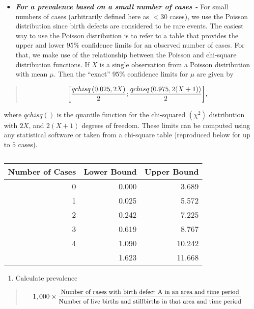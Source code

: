 \documentclass[
]{krantz}
\providecommand{\tightlist}{%
  \setlength{\itemsep}{0pt}\setlength{\parskip}{0pt}}
\begin{document}
\begin{itemize}
\tightlist
\item
  \textbf{\emph{For a prevalence based on a small number of cases -}} For small numbers of cases (arbitrarily defined here as \(< 30\) cases), we use the Poisson distribution since birth defects are considered to be rare events. The easiest way to use the Poisson distribution is to refer to a table that provides the upper and lower \(95\%\) confidence limits for an observed number of cases. For that, we make use of the relationship between the Poisson and chi-square distribution functions. If \(X\) is a single observation from a Poisson distribution with mean \(\mu\). Then the ``exact'' \(95\%\) confidence limits for \(\mu\) are given by
\end{itemize}

\begin{quote}
\[
\small{
\left[\dfrac{qchisq\left(0.025, 2X\right)}{2}; \dfrac{qchisq\left(0.975, 2(X+1)\right)}{2}\right]},
\]
\end{quote}

where \(qchisq()\) is the quantile function for the chi-squared \(\left(\chi^{2}\right)\) distribution with \(2X\), and \(2(X+1)\) degrees of freedom. These limits can be computed using any statistical software or taken from a chi-square table (reproduced below for up to \(5\) cases).

\begin{table}

\caption{\label{tab:pois1}}
\centering
\begin{tabular}[t]{rrr}
\toprule
Number of Cases & Lower Bound & Upper Bound\\
\midrule
0 & 0.000 & 3.689\\
1 & 0.025 & 5.572\\
2 & 0.242 & 7.225\\
3 & 0.619 & 8.767\\
4 & 1.090 & 10.242\\
\addlinespace
5 & 1.623 & 11.668\\
\bottomrule
\end{tabular}
\end{table}

\begin{enumerate}
\def\labelenumi{\arabic{enumi}.}
\tightlist
\item
  Calculate prevalence
\end{enumerate}

\begin{quote}
\[\small{
1,000 \times \dfrac{\text{Number of cases with birth defect A in an area and time period}}{\text{Number of live births and stillbirths in that area and time period}}
}\]
\end{quote}
\end{document}
